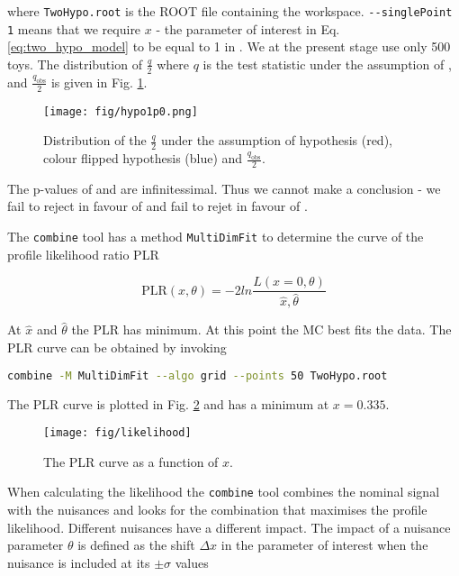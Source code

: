 where  \lstinline[language=sh]|TwoHypo.root| is the ROOT file containing the workspace. \lstinline[language=sh]|--singlePoint 1| means that we require $x$ - the parameter of interest in Eq. \ref{eq:two_hypo_model} to be equal to 1 in \Halt. We at the present stage use only 500 toys. The distribution of $\frac{q}{2}$ where $q$ is the test statistic under the assumption of \Hnull, \Halt and $\frac{q_{\text{obs}}}{2}$ is given in Fig. \ref{fig:hypo1p0}.

\begin{figure}
  \centering
  \texttt{[image: fig/hypo1p0.png]}
  \caption{Distribution of the $\frac{q}{2}$ under the assumption of \ttbar hypothesis (red), colour flipped \ttbar hypothesis (blue) and $\frac{q_{\text{obs}}}{2}$.}
  \label{fig:hypo1p0}
\end{figure}

The p-values of \Halt and \Hnull are infinitessimal. Thus we cannot make a conclusion - we fail to reject \Hnull in favour of \Halt and fail to rejet \Halt in favour of \Hnull.

The \lstinline[language=sh]|combine| tool has a method \lstinline[language=sh]|MultiDimFit| to determine the curve of the profile likelihood ratio PLR

\begin{equation}
  \text{PLR}(x, \theta)=-2ln\frac{L(x=0, \theta)}{\hat{x}, \hat{\theta}}
\end{equation}

At $\hat{x}$ and $\hat{\theta}$ the PLR has minimum. At this point the MC best fits the data. The PLR curve can be obtained by invoking

\begin{lstlisting}[language=sh, breaklines=true]
combine -M MultiDimFit --algo grid --points 50 TwoHypo.root
\end{lstlisting}

The PLR curve is plotted in Fig. \ref{fig:likelihood} and has a minimum at $x=0.335$.

\begin{figure}
  \centering
  \texttt{[image: fig/likelihood]}
  \caption{The PLR curve as a function of $x$.}
  \label{fig:likelihood}
\end{figure}

When calculating the likelihood the \lstinline[language=sh]|combine| tool combines the nominal signal with the nuisances and looks for the combination that maximises the profile likelihood. Different nuisances have a different impact. The impact of a nuisance parameter $\theta$ is defined as the shift $\Delta x$ in the parameter of interest when the nuisance is included at its $\pm\sigma$ values

